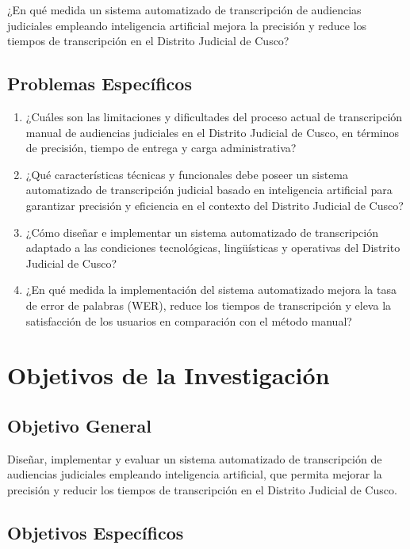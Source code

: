 \documentclass[12pt,a4paper,oneside]{report}
\begin{document}
¿En qué medida un sistema automatizado de transcripción de audiencias judiciales empleando inteligencia artificial mejora la precisión y reduce los tiempos de transcripción en el Distrito Judicial de Cusco?

\subsection{Problemas Específicos}

\begin{enumerate}[label=\alph*)]
  \item ¿Cuáles son las limitaciones y dificultades del proceso actual de transcripción manual de audiencias judiciales en el Distrito Judicial de Cusco, en términos de precisión, tiempo de entrega y carga administrativa?
  \item ¿Qué características técnicas y funcionales debe poseer un sistema automatizado de transcripción judicial basado en inteligencia artificial para garantizar precisión y eficiencia en el contexto del Distrito Judicial de Cusco?
  \item ¿Cómo diseñar e implementar un sistema automatizado de transcripción adaptado a las condiciones tecnológicas, lingüísticas y operativas del Distrito Judicial de Cusco?
  \item ¿En qué medida la implementación del sistema automatizado mejora la tasa de error de palabras (WER), reduce los tiempos de transcripción y eleva la satisfacción de los usuarios en comparación con el método manual?
\end{enumerate}

\section{Objetivos de la Investigación}

\subsection{Objetivo General}

Diseñar, implementar y evaluar un sistema automatizado de transcripción de audiencias judiciales empleando inteligencia artificial, que permita mejorar la precisión y reducir los tiempos de transcripción en el Distrito Judicial de Cusco.

\subsection{Objetivos Específicos}
\end{document}
